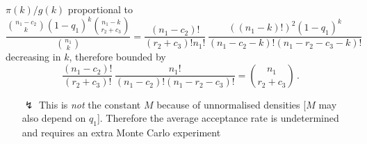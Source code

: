 \begin{slide}
\end{slide}\begin{slide}

$\pi(k)/g(k)$ proportional to
\footnotesize
$$
\frac{{n_1-c_2\choose k} (1-q_1)^k {n_1-k\choose r_2+c_3}}
{{n_1\choose k}} = \frac{(n_1-c_2)!}{(r_2+c_3)!n_1!}\,
\frac{((n_1-k)!)^2(1-q_1)^k}{(n_1-c_2-k)!(n_1-r_2-c_3-k)!}
$$\normalsize
decreasing in $k$, therefore bounded by
\small$$
\frac{(n_1-c_2)!}{(r_2+c_3)!}\,
\frac{n_1!}{(n_1-c_2)!(n_1-r_2-c_3)!}={n_1\choose r_2+c_3}\,.
$$\normalsize

\pause
\begin{itemize}
\item[$\lightning$] This is {\em not} the constant $M$ because of unnormalised 
densities [$M$ may also depend on $q_1$]. Therefore the average acceptance rate 
is undetermined and requires an extra Monte Carlo experiment
\end{itemize}

\end{slide}
